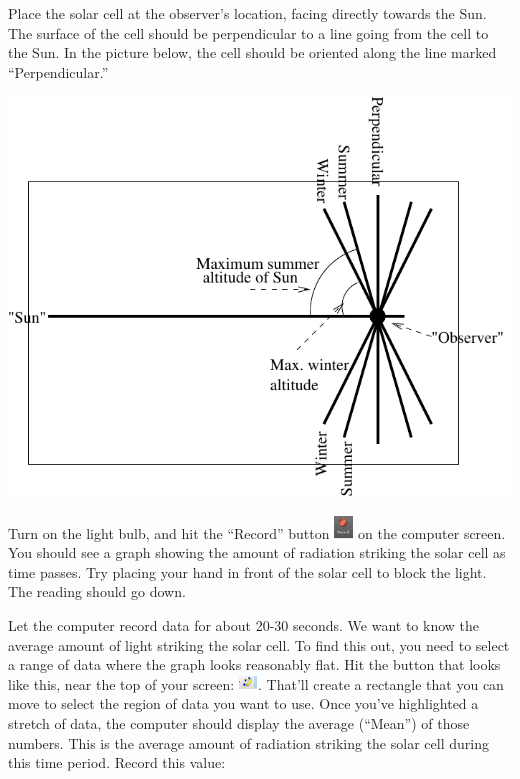 Place the solar cell at the observer's location,
facing directly towards the Sun. The surface of the cell
should be perpendicular to a line going from the cell to the Sun.
In the picture below, the cell should be oriented along the
line marked ``Perpendicular.''

\centerline{\includegraphics{solarcell/solarcellfig.pdf}}

Turn on the light bulb, and hit the ``Record''
button \includegraphics[width=0.2in]{solarcell/capstone-record.pdf} on the
computer screen.  You should see a graph showing the amount
of radiation striking the solar cell as time passes.  Try placing
your hand in front of the solar cell to block the light.  The
reading should go down.

Let the computer record data for about 20-30 seconds.  
We want to know the average amount of light striking the solar
cell. To find this out, you need to select a range of
data where the graph looks reasonably flat.
Hit the button that looks like this, near the top of your screen:
\includegraphics[width=0.2in]{solarcell/capstone-select.pdf}.
That'll create a rectangle that you can move to select the
region of data you want to use.
Once you've highlighted a stretch of data, the computer should
display the average (``Mean'') of those numbers.  This is the 
average amount of radiation striking the solar cell during
this time period.  Record this value:

